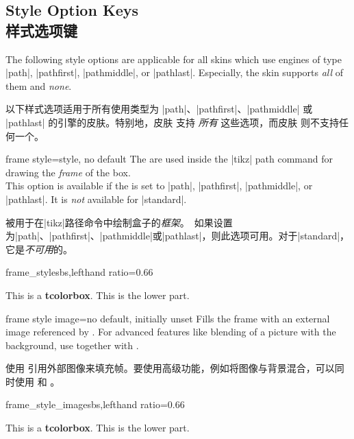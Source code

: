 \subsection{Style Option Keys\\样式选项键}\label{subsec:addstyleoptions}

The following style options are applicable for all skins which
use engines of type |path|, |pathfirst|, |pathmiddle|, or |pathlast|.
Especially, the skin  supports \emph{all} of them
and  \emph{none}.

以下样式选项适用于所有使用类型为 |path|、|pathfirst|、|pathmiddle| 或 |pathlast| 的引擎的皮肤。特别地，皮肤  支持 \emph{所有} 这些选项，而皮肤  则不支持任何一个。


\begin{docTcbKey}{frame style}{=}{style, no default}
The  are used inside the |tikz| path command
for drawing the \emph{frame} of the box.\\
This option is available if the  is set to
|path|, |pathfirst|, |pathmiddle|, or |pathlast|.
It is \emph{not} available for |standard|.

被用于在|tikz|路径命令中绘制盒子的\emph{框架}。\ 如果设置为|path|、|pathfirst|、|pathmiddle|或|pathlast|，则此选项可用。对于|standard|，它是\emph{不可用}的。
\begin{exdispExample*}{frame_style}{sbs,lefthand ratio=0.66}

\begin{tcolorbox}[enhanced,title=My title,
frame style={left color=red!75!black,
              right color=blue!75!black}]
This is a \textbf{tcolorbox}.
\tcblower
This is the lower part.
\end{tcolorbox}
\end{exdispExample*}
\end{docTcbKey}

\begin{docTcbKey}{frame style image}{=}{no default, initially unset}
Fills the frame with an external image referenced by .
For advanced features like blending of a picture with the background,
use  together with .

使用  引用外部图像来填充帧。要使用高级功能，例如将图像与背景混合，可以同时使用  和 。
\begin{exdispExample*}{frame_style_image}{sbs,lefthand ratio=0.66}

\begin{tcolorbox}[enhanced,title=My title,
  frame style image=blueshade.png]
This is a \textbf{tcolorbox}.
\tcblower
This is the lower part.
\end{tcolorbox}
\end{exdispExample*}
\end{docTcbKey}

